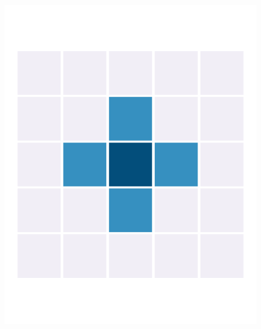 \begin{figure} %
    \centering %
    \begin{minipage}[b]{.22\linewidth} %
        \includegraphics[width=\linewidth,trim={0.7cm 2.2cm 0.7cm 2.2cm},clip]{body/figures/61-nb_e.pdf} %
    \end{minipage} %
    \hfill

\end{figure}
